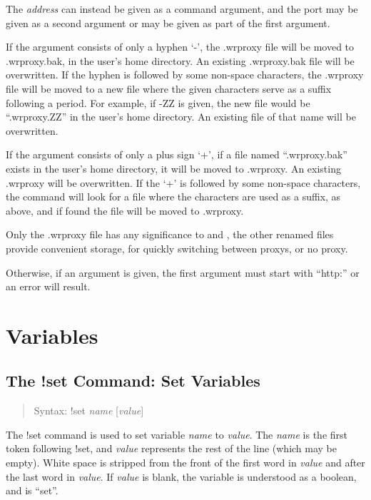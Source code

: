 The {\it address} can instead be given as a command argument, and the
port may be given as a second argument or may be given as part of the
first argument.

If the argument consists of only a hyphen `{\vt -}', the {\vt
.wrproxy} file will be moved to {\vt .wrproxy.bak}, in the user's home
directory.  An existing {\vt .wrproxy.bak} file will be overwritten. 
If the hyphen is followed by some non-space characters, the {\vt
.wrproxy} file will be moved to a new file where the given characters
serve as a suffix following a period.  For example, if {\vt -ZZ} is
given, the new file would be ``{\vt .wrproxy.ZZ}'' in the user's home
directory.  An existing file of that name will be overwritten.

If the argument consists of only a plus sign `{\vt +}', if a file
named ``{\vt .wrproxy.bak}'' exists in the user's home directory, it
will be moved to {\vt .wrproxy}.  An existing {\vt .wrproxy} will be
overwritten.  If the `{\vt +}' is followed by some non-space
characters, the command will look for a file where the characters are
used as a suffix, as above, and if found the file will be moved to
{\vt .wrproxy}.

Only the {\vt .wrproxy} file has any significance to {\Xic} and
{\WRspice}, the other renamed files provide convenient storage, for
quickly switching between proxys, or no proxy.

Otherwise, if an argument is given, the first argument must start with
``{\vt http:}'' or an error will result.

\section{Variables}
\label{setcmd}

\subsection{The {\cb !set} Command: Set Variables}
\begin{quote}
Syntax: {\vt !set} {\it name} [{\it value\/}]
\end{quote}
The {\cb !set} command is used to set variable {\it name} to {\it
value}.  The {\it name} is the first token following {\cb !set}, and
{\it value} represents the rest of the line (which may be empty). 
White space is stripped from the front of the first word in
{\it value} and after the last word in {\it value}.  If {\it value}
is blank, the variable is understood as a boolean, and is ``set''.

